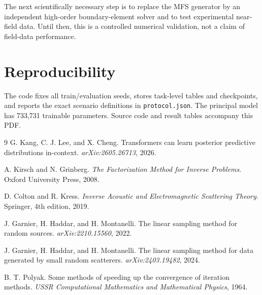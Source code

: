 \documentclass[10pt]{article}
\begin{document}
The next scientifically necessary step is to replace the MFS generator by an
independent high-order boundary-element solver and to test experimental near-
field data.  Until then, this is a controlled numerical validation, not a claim
of field-data performance.

\section{Reproducibility}
The code fixes all train/evaluation seeds, stores task-level tables and
checkpoints, and reports the exact scenario definitions in
\texttt{protocol.json}.  The principal model has
733,731 trainable parameters.  Source code and result
tables accompany this PDF.

\begin{thebibliography}{9}
G. Kang, C. J. Lee, and X. Cheng.
\newblock Transformers can learn posterior predictive distributions in-context.
\newblock \emph{arXiv:2605.26713}, 2026.

A. Kirsch and N. Grinberg.
\newblock \emph{The Factorization Method for Inverse Problems}.
\newblock Oxford University Press, 2008.

D. Colton and R. Kress.
\newblock \emph{Inverse Acoustic and Electromagnetic Scattering Theory}.
\newblock Springer, 4th edition, 2019.

J. Garnier, H. Haddar, and H. Montanelli.
\newblock The linear sampling method for random sources.
\newblock \emph{arXiv:2210.15560}, 2022.

J. Garnier, H. Haddar, and H. Montanelli.
\newblock The linear sampling method for data generated by small random scatterers.
\newblock \emph{arXiv:2403.19482}, 2024.

B. T. Polyak.
\newblock Some methods of speeding up the convergence of iteration methods.
\newblock \emph{USSR Computational Mathematics and Mathematical Physics}, 1964.
\end{thebibliography}
\end{document}
